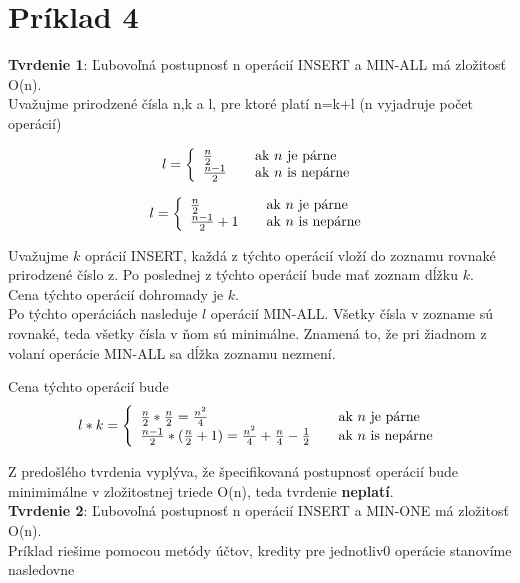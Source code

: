 \documentclass[paper=a4, fontsize=11pt]{scrartcl} %
\numberwithin{equation}{section} %
\numberwithin{figure}{section} %
\numberwithin{table}{section} %
\begin{document}
\section*{Príklad 4}

\textbf{Tvrdenie 1}: Ľubovoľná postupnosť n operácií INSERT  a MIN-ALL má zložitosť O(n). \\

Uvažujme prirodzené čísla n,k a l, pre ktoré platí n=k+l (n vyjadruje počet operácií)

\[ l = \left\{ 
  \begin{array}{l l}
    \frac{n}{2} & \quad \text{ak $n$ je párne}\\
    \frac{n-1}{2} & \quad \text{ak $n$ is nepárne}
  \end{array} \right.\]

\[ l = \left\{ 
  \begin{array}{l l}
    \frac{n}{2} & \quad \text{ak $n$ je párne}\\
    \frac{n-1}{2} + 1 & \quad \text{ak $n$ is nepárne}
  \end{array} \right.\]


Uvažujme $k$ oprácií INSERT, každá z týchto operácií vloží do zoznamu rovnaké prirodzené číslo z.
Po poslednej z týchto operácií bude mať zoznam dĺžku $k$. \\

Cena týchto operácií dohromady je $k$. \\

Po týchto operáciách nasleduje $l$ operácií MIN-ALL.
Všetky čísla v zozname sú rovnaké, teda všetky čísla v ňom sú minimálne.
Znamená to, že pri žiadnom z volaní operácie MIN-ALL sa dĺžka zoznamu nezmení.


Cena týchto operácií bude 
\[ l*k = \left\{ 
  \begin{array}{l l}
    \frac{n}{2}* \frac{n}{2} = \frac{n^2}{4} & \quad \text{ak $n$ je párne}\\
    \frac{n-1}{2}* (\frac{n}{2} + 1) = \frac{n^2}{4} + \frac{n}{4} - \frac{1}{2} & \quad \text{ak $n$ is nepárne}
  \end{array} \right.\]

Z predošlého tvrdenia vyplýva, že špecifikovaná postupnosť operácií bude minimimálne v zložitostnej triede O(n), teda tvrdenie \textbf{neplatí}. \\

\textbf{Tvrdenie 2}: Ľubovoľná postupnosť n operácií INSERT  a MIN-ONE má zložitosť O(n). \\
Príklad riešime pomocou metódy účtov, kredity pre jednotliv0 operácie stanovíme nasledovne \\
\end{document}
